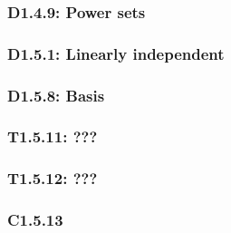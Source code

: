 \documentclass{article}
\begin{document}
\begin{multicols*}{3}
\subsubsection*{D1.4.9: Power sets}

\subsubsection*{D1.5.1: Linearly independent}

\subsubsection*{D1.5.8: Basis}

\subsubsection*{T1.5.11: ???}

\subsubsection*{T1.5.12: ???}

\subsubsection*{C1.5.13}

\end{multicols*}
\end{document}
